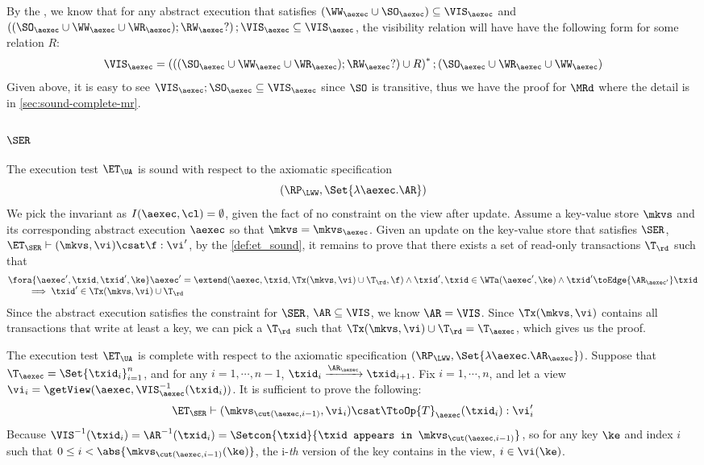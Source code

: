 By the \cite{cerone:snapshot}, we know that for any abstract execution that satisfies \( (\WW_\aexec \cup \SO_\aexec) \subseteq \VIS_\aexec \)
and \( \left( (\SO_\aexec \cup \WW_\aexec \cup \WR_\aexec ) ; \RW_{\aexec}? \right) ; \VIS_\aexec \subseteq \VIS_\aexec \),
the visibility relation will have have the following form for some relation \( R \):
\[
    \VIS_\aexec = \left( \left( (\SO_\aexec \cup \WW_\aexec \cup \WR_\aexec ) ; \RW_{\aexec}? \right)  \cup R \right)^* ; (\SO_\aexec \cup \WR_\aexec \cup \WW_\aexec) 
\]
Given above, it is easy to see \( \VIS_\aexec ; \SO_\aexec \subseteq \VIS_\aexec \) since \( \SO \) is transitive, 
thus we have the proof for \( \MRd \) where the detail is in \cref{sec:sound-complete-mr}.


\subsubsection{ \( \SER \)}

The execution test $\ET_\UA$ is sound with respect to the axiomatic specification 
\[ 
    (\RP_{\LWW}, \Set{\lambda \aexec. \AR })
\]
We pick the invariant as \( I( \aexec, \cl ) = \emptyset \), given the fact of no constraint on the view after update.
Assume a key-value store \( \mkvs \) and its corresponding abstract execution \( \aexec \) so that \( \mkvs = \mkvs_\aexec \).
Given an update on the key-value store that satisfies \( \SER \), \ie \(\ET_\SER \vdash (\mkvs, \vi) \csat \f : \vi' \),
by the \cref{def:et_sound}, it remains to prove that there exists a set of read-only transactions \( \T_\rd \) such that
\[
    \begin{array}{@{}l@{}}
        \fora{ \aexec', \txid, \txid', \ke } 
        \aexec' = \extend(\aexec, \txid, \Tx(\mkvs, \vi) \cup \T_\rd, \f ) 
        \land \txid', \txid \in \WTa(\aexec', \ke) \land  \txid' \toEdge{\AR_{\aexec'}} \txid  \\
        \qquad {} \implies \txid' \in \Tx(\mkvs, \vi) \cup \T_\rd
    \end{array}
\]
Since the abstract execution satisfies the constraint for \( \SER \), \ie \( \AR \subseteq \VIS \), we know \( \AR = \VIS \).
Since \( \Tx(\mkvs, \vi)  \) contains all transactions that write at least a key, 
we can pick a \( \T_\rd \) such that \( \Tx(\mkvs, \vi) \cup \T_\rd = \T_\aexec\),
which gives us the proof.

The execution test $\ET_\UA$ is complete with respect to the axiomatic specification \( (\RP_{\LWW}, \Set{\lambda \aexec. \AR_\aexec }) \).
Suppose that $\T_{\aexec} = \Set{\txid_{i}}_{i=1}^{n}$, and for any $i=1,\cdots, n-1$,
$\txid_{i} \xrightarrow{\AR_{\aexec}} \txid_{i+1}$.
Fix $i=1,\cdots,n$, and let a view $\vi_{i} = \getView(\aexec, \VIS^{-1}_{\aexec}(\txid_{i}))$.
It is sufficient to prove the following:
\[
    \ET_\SER \vdash ( \mkvs_{\cut(\aexec, i-1)}, \vi_i ) \csat \TtoOp{T}_{\aexec}(\txid_{i}) : \vi'_{i}
\]
Because \( \VIS^{-1}(\txid_i) = \AR^{-1}(\txid_i) = \Setcon{\txid }{\txid \texttt{ appears in } \mkvs_{\cut(\aexec, i-1)} }\),
so for any key \( \ke \) and index \( i \) such that \( 0 \leq i < \abs{\mkvs_{\cut(\aexec, i-1)}(\ke)} \),
the i-\emph{th} version of the key contains in the view, \ie \( i \in \vi(\ke)\).

